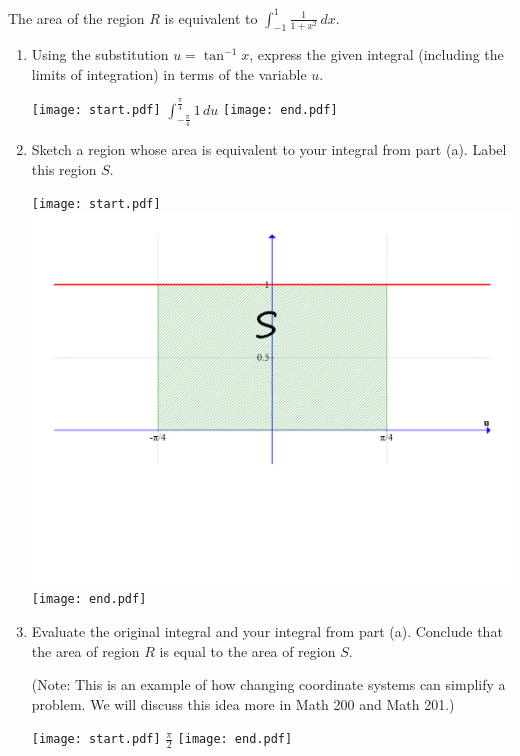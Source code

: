 \documentclass[12pt]{article}
\begin{document}
\begin{enumerate}
\begin{center}
\end{center}

The area of the region $R$ is equivalent to $\int_{-1}^1 \frac{1}{1+x^2} \,dx$.

\begin{enumerate}

\item Using the substitution $u=\tan^{-1}x$, express the given integral (including the limits of integration) in terms of the variable $u$.

\texttt{[image: start.pdf]}
{{$\int_{-\frac{\pi}{4}}^{\frac{\pi}{4}} 1 \,du$}}
\texttt{[image: end.pdf]}


\item Sketch a region whose area is equivalent to your integral from part (a).  Label this region $S$.

\texttt{[image: start.pdf]}
{{\includegraphics[scale=0.3]{area2.pdf}}}
\texttt{[image: end.pdf]}


\item Evaluate the original integral and your integral from part (a).  Conclude that the area of region $R$ is equal to the area of region $S$.

(Note: This is an example of how changing coordinate systems can simplify a problem.  We will discuss this idea more in Math 200 and Math 201.)

\texttt{[image: start.pdf]}
{{$\frac{\pi}{2}$}}
\texttt{[image: end.pdf]}


\end{enumerate}

\end{enumerate}
\end{document}
